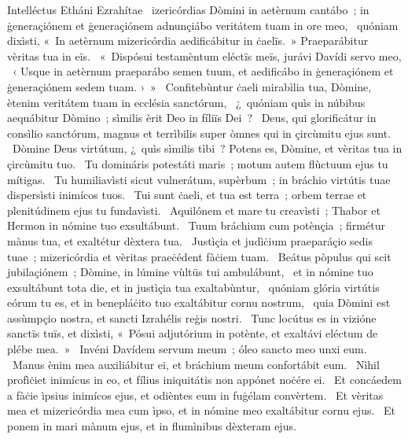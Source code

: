 { Intelléctus Etháni Ezrahítae}
{%
~izericórdias Dòmini in aetèrnum cantábo~; in ġeneraçiónem et ġeneraçiónem adnunçiábo veritátem tuam in ore meo, 
~quóniam dixìsti, «~In aetèrnum mizericórdia aedificábitur in ċaelïs.~» Praeparábitur vèritas tua in eïs. 
~«~Dispósui testamèntum eléctïs meïs, jurávi Davídi servo meo, 
~‹ Usque in aetèrnum praeparábo semen tuum, et aedificábo in ġeneraçiónem et ġeneraçiónem sedem tuam. ›~»
~Confitebùntur ċaeli mirabìlia tua, Dòmine, ètenim veritátem tuam in ecclésia sanctórum, 
~¿~quóniam quìs in núbibus aequábitur Dòmino~; sìmilis èrit Deo in fíliïs Dei~? 
~Deus, qui glorificátur in consìlio sanctórum, magnus et terrìbilis super òmnes qui in çircùmitu ejus sunt. 
~Dòmine Deus virtútum, ¿~quìs sìmilis tìbi~? Potens es, Dòmine, et vèritas tua in çircùmitu tuo. 
~Tu domináris potestáti maris~; motum autem flùctuum ejus tu mítigas. 
~Tu humiliavìsti sicut vulnerátum, supèrbum~; in bráchio virtútis tuae dispersìsti inimícos tuos. 
~Tui sunt ċaeli, et tua est terra~; orbem terrae et plenitúdinem ejus tu fundavìsti. 
~Aquilónem et mare tu creavìsti~; Thabor et Hermon in nómine tuo exsultábunt. 
~Tuum bráchium cum potènçia~; firmétur mànus tua, et exaltétur dèxtera tua. 
~Justìçia et judìċium praeparáçio sedis tuae~; mizericórdia et vèritas praeċédent fàċiem tuam. 
~Beátus pòpulus qui scit jubilaçiónem~; Dòmine, in lúmine vùltüs tui ambulábunt, 
~et in nómine tuo exsultábunt tota die, et in justìçia tua exaltabùntur, 
~quóniam glória virtútis eórum tu es, et in benepláċito tuo exaltábitur cornu nostrum, 
~quia Dòmini est assùmpçio nostra, et sancti Izrahélis reġis nostri. 
~Tunc locútus es in vizióne sanctïs tuïs, et dixìsti, «~Pósui adjutórium in potènte, et exaltávi eléctum de plébe mea.~» 
~Invéni Davídem servum meum~; óleo sancto meo unxi eum. 
~Manus ènim mea auxiliábitur ei, et bráchium meum confortábit eum. 
~Nìhil profìċiet inimícus in eo, et fílius iniquitátis non appónet noċére ei. 
~Et concáedem a fàċie ìpsius inimícos ejus, et odièntes eum in fuġélam convèrtem. 
~Et vèritas mea et mizericórdia mea cum ìpso, et in nómine meo exaltábitur cornu ejus. 
~Et ponem in mari mànum ejus, et in flumìnibus dèxteram ejus. 
}
